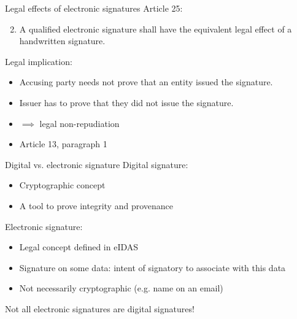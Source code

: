 \begin{frame}{Legal effects of electronic signatures}
  \pause
  Article 25:
  \begin{enumerate}
    \setcounter{enumi}{1}
    \item A qualified electronic signature shall have the equivalent legal effect of a handwritten signature.
  \end{enumerate}

  \vspace*{1em}

  \pause
  Legal implication:
  \begin{itemize}[<+(1)->]
    \item Accusing party needs not prove that an entity issued the signature.
    \item Issuer has to prove that they did not issue the signature.
    \item $\implies$ legal non-repudiation
    \item Article 13, paragraph 1
  \end{itemize}
\end{frame}

\begin{frame}{Digital vs. electronic signature}
  Digital signature:
  \begin{itemize}[<+(1)->]
    \item Cryptographic concept
    \item A tool to prove integrity and provenance
  \end{itemize}

  \vspace*{1em}

  \pause
  Electronic signature:
  \begin{itemize}[<+(1)->]
    \item Legal concept defined in eIDAS
    \item Signature on some data: intent of signatory to associate with this data
    \item Not necessarily cryptographic (e.g. name on an email)
  \end{itemize}

  \vspace*{1em}

  \pause
  Not all electronic signatures are digital signatures!
\end{frame}

